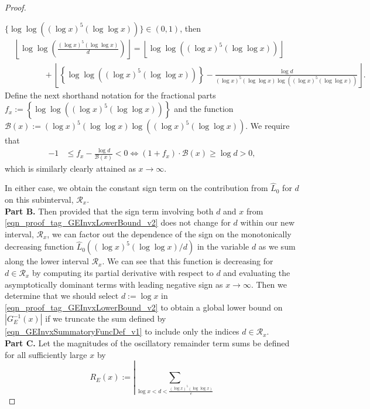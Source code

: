 \documentclass[11pt,reqno,a4letter]{article}
\numberwithin{figure}{section}
\numberwithin{table}{section}
\newcommand{\floor}[1]{\left\lfloor #1 \right\rfloor}
\theoremstyle{plain}
\numberwithin{theorem}{section}
\theoremstyle{definition}
\begin{document}
\begin{proof}
\begin{itemize}[itemsep=0pt,topsep=0pt,leftmargin=0.35in]
     $\{\log\log\left((\log x)^{5} (\log\log x)\right)\} \in (0, 1)$, then 
     \begin{align*} 
     & \floor{\log\log\left(\frac{(\log x)^{5} (\log\log x)}{d}\right)} = 
          \floor{\log\log\left((\log x)^{5} (\log\log x)\right)} \\ 
          & \phantom{\qquad =\ } + 
          \floor{\left\{\log\log\left((\log x)^{5} (\log\log x)\right)\right\} - 
          \frac{\log d}{(\log x)^{5} (\log\log x) \log\left( 
          (\log x)^{5} (\log\log x)\right)}}. 
     \end{align*} 
     Define the next shorthand notation for the fractional parts 
     $f_x := \left\{\log\log\left((\log x)^{5} (\log\log x)\right)\right\}$ and the function 
     $\mathcal{B}(x) := (\log x)^{5} (\log\log x) \log\left((\log x)^{5} (\log\log x)\right)$. 
     We require that 
     \begin{align*} 
     -1 & \leq f_x - \frac{\log d}{\mathcal{B}(x)} < 0 \iff 
          (1 + f_x) \cdot \mathcal{B}(x) \geq \log d > 0, 
     \end{align*} 
     which is similarly clearly attained as $x \rightarrow \infty$. 
\end{itemize} 
In either case, we obtain the constant sign term on the contribution from 
$\widehat{L}_0$ for $d$ on this subinterval, $\mathcal{R}_x$. \\ 
\textbf{Part B.} 
Then provided that the sign term involving both $d$ and $x$ 
from \eqref{eqn_proof_tag_GEInvxLowerBound_v2} does not change for $d$ within our new interval, 
$\mathcal{R}_x$, 
we can factor out the dependence of the sign on the monotonically 
decreasing function 
$\widehat{L}_0\left((\log x)^{5} (\log\log x)/d\right)$ 
in the variable $d$ as we sum along the lower interval $\mathcal{R}_x$. 
We can see that this function is decreasing 
for $d \in \mathcal{R}_x$ by computing its partial derivative with respect to $d$ and 
evaluating the asymptotically dominant terms with leading negative sign as 
$x \rightarrow \infty$. 
Then we determine that we should select $d := \log x$ in 
\eqref{eqn_proof_tag_GEInvxLowerBound_v2} to 
obtain a global lower bound on $|G_E^{-1}(x)|$ if we truncate the sum 
defined by \eqref{eqn_GEInvxSummatoryFuncDef_v1} to include only the 
indices $d \in \mathcal{R}_x$. \\ 
\textbf{Part C.} 
Let the magnitudes of the oscillatory remainder term sums be 
defined for all sufficiently large $x$ by 
\[
R_E(x) := \left\lvert \sum_{\log x < d < \frac{(\log x)^{5} (\log\log x)}{e}} 
\]
\end{proof}
\end{document}
